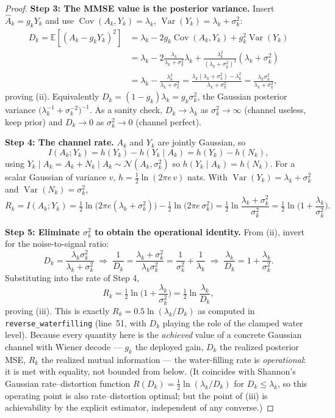 \begin{proof}
\medskip
\noindent\textbf{Step 3: The MMSE value is the posterior variance.}
Insert $\hat A_k=g_kY_k$ and use $\operatorname{Cov}(A_k,Y_k)=\lambda_k$, $\operatorname{Var}(Y_k)=\lambda_k+\sigma_k^2$:
\[
\begin{aligned}
D_k=\mathbb{E}\!\left[(A_k-g_kY_k)^2\right]
&=\lambda_k-2g_k\operatorname{Cov}(A_k,Y_k)+g_k^2\operatorname{Var}(Y_k)\\
&=\lambda_k-2\frac{\lambda_k}{\lambda_k+\sigma_k^2}\lambda_k+\frac{\lambda_k^2}{(\lambda_k+\sigma_k^2)^2}(\lambda_k+\sigma_k^2)\\
&=\lambda_k-\frac{\lambda_k^2}{\lambda_k+\sigma_k^2}
=\frac{\lambda_k(\lambda_k+\sigma_k^2)-\lambda_k^2}{\lambda_k+\sigma_k^2}
=\frac{\lambda_k\sigma_k^2}{\lambda_k+\sigma_k^2},
\end{aligned}
\]
proving (ii). Equivalently $D_k=(1-g_k)\lambda_k=g_k\sigma_k^2$, the Gaussian posterior variance $\big(\lambda_k^{-1}+\sigma_k^{-2}\big)^{-1}$. As a sanity check, $D_k\to\lambda_k$ as $\sigma_k^2\to\infty$ (channel useless, keep prior) and $D_k\to0$ as $\sigma_k^2\to0$ (channel perfect).

\medskip
\noindent\textbf{Step 4: The channel rate.}
$A_k$ and $Y_k$ are jointly Gaussian, so
\[
I(A_k;Y_k)=h(Y_k)-h(Y_k\mid A_k)=h(Y_k)-h(N_k),
\]
using $Y_k\mid A_k = A_k+N_k\mid A_k \sim \mathcal{N}(A_k,\sigma_k^2)$ so $h(Y_k\mid A_k)=h(N_k)$. For a scalar Gaussian of variance $v$, $h=\tfrac12\ln(2\pi e\,v)$ nats. With $\operatorname{Var}(Y_k)=\lambda_k+\sigma_k^2$ and $\operatorname{Var}(N_k)=\sigma_k^2$,
\[
R_k=I(A_k;Y_k)=\tfrac12\ln\!\big(2\pi e(\lambda_k+\sigma_k^2)\big)-\tfrac12\ln\!\big(2\pi e\,\sigma_k^2\big)
=\tfrac12\ln\frac{\lambda_k+\sigma_k^2}{\sigma_k^2}
=\tfrac12\ln\!\Big(1+\frac{\lambda_k}{\sigma_k^2}\Big).
\]

\medskip
\noindent\textbf{Step 5: Eliminate $\sigma_k^2$ to obtain the operational identity.}
From (ii), invert for the noise-to-signal ratio:
\[
D_k=\frac{\lambda_k\sigma_k^2}{\lambda_k+\sigma_k^2}
\;\Longrightarrow\;
\frac{1}{D_k}=\frac{\lambda_k+\sigma_k^2}{\lambda_k\sigma_k^2}
=\frac{1}{\sigma_k^2}+\frac{1}{\lambda_k}
\;\Longrightarrow\;
\frac{\lambda_k}{D_k}=1+\frac{\lambda_k}{\sigma_k^2}.
\]
Substituting into the rate of Step 4,
\[
R_k=\tfrac12\ln\!\Big(1+\frac{\lambda_k}{\sigma_k^2}\Big)=\tfrac12\ln\frac{\lambda_k}{D_k},
\]
proving (iii). This is exactly $R_k=0.5\ln(\lambda_k/D_k)$ as computed in \texttt{reverse\_waterfilling} (line~51, with $D_k$ playing the role of the clamped water level). Because every quantity here is the \emph{achieved} value of a concrete Gaussian channel with Wiener decode --- $g_k$ the deployed gain, $D_k$ the realized posterior MSE, $R_k$ the realized mutual information --- the water-filling rate is \emph{operational}: it is met with equality, not bounded from below. (It coincides with Shannon's Gaussian rate--distortion function $R(D_k)=\tfrac12\ln(\lambda_k/D_k)$ for $D_k\le\lambda_k$, so this operating point is also rate--distortion optimal; but the point of (iii) is achievability by the explicit estimator, independent of any converse.)


\end{proof}
